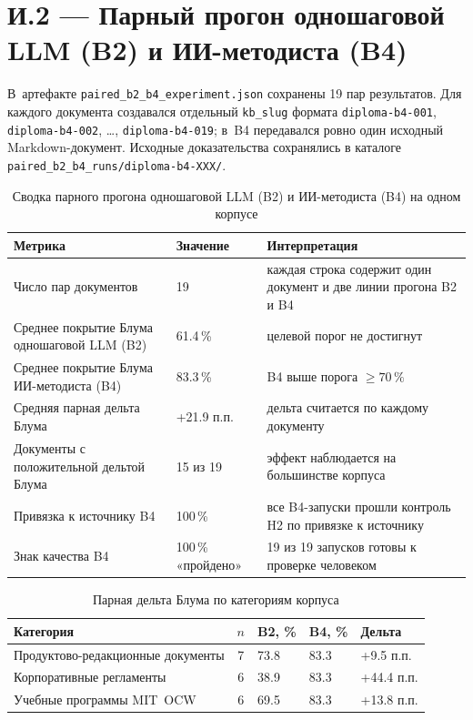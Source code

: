 \section*{И.2 — Парный прогон одношаговой LLM (B2) и ИИ-методиста (B4)}

В~артефакте \texttt{paired\_b2\_b4\_experiment.json} сохранены 19 пар
результатов. Для каждого документа создавался отдельный \texttt{kb\_slug}
формата \texttt{diploma-b4-001}, \texttt{diploma-b4-002}, \ldots,
\texttt{diploma-b4-019}; в~B4 передавался ровно один исходный
Markdown-документ. Исходные доказательства сохранялись в каталоге
\texttt{paired\_b2\_b4\_runs/diploma-b4-XXX/}.

\begin{table}[H]
  \caption{Сводка парного прогона одношаговой LLM (B2) и ИИ-методиста (B4) на одном корпусе}
  \label{tab:appendix-paired-b2-b4}
  \centering
  \begin{tabular}{|P{5.7cm}|P{2.5cm}|P{4.0cm}|}
  \hline
  \textbf{Метрика} & \textbf{Значение} & \textbf{Интерпретация} \\
  \hline
  Число пар документов & 19 & каждая строка содержит один документ и две линии прогона B2 и B4 \\
  \hline
  Среднее покрытие Блума одношаговой LLM (B2) & 61.4\,\% & целевой порог не достигнут \\
  \hline
  Среднее покрытие Блума ИИ-методиста (B4) & 83.3\,\% & B4 выше порога $\geq 70\,\%$ \\
  \hline
  Средняя парная дельта Блума & +21.9 п.п. & дельта считается по каждому документу \\
  \hline
  Документы с положительной дельтой Блума & 15 из 19 & эффект наблюдается на большинстве корпуса \\
  \hline
  Привязка к источнику B4 & 100\,\% & все B4-запуски прошли контроль H2 по привязке к источнику \\
  \hline
  Знак качества B4 & 100\,\% «пройдено» & 19 из 19 запусков готовы к проверке человеком \\
  \hline
  \end{tabular}
\end{table}

\begin{table}[H]
  \caption{Парная дельта Блума по категориям корпуса}
  \label{tab:appendix-paired-category}
  \centering
  \begingroup
  \small
  \setlength{\tabcolsep}{3pt}
  \renewcommand{\arraystretch}{1.12}
  \begin{tabular}{|P{4.8cm}|c|P{2.0cm}|P{2.0cm}|P{2.2cm}|}
  \hline
  \textbf{Категория} & \textbf{$n$} & \textbf{B2, \%} & \textbf{B4, \%} & \textbf{Дельта} \\
  \hline
  Продуктово-редакционные документы & 7 & 73.8 & 83.3 & +9.5 п.п. \\
  \hline
  Корпоративные регламенты & 6 & 38.9 & 83.3 & +44.4 п.п. \\
  \hline
  Учебные программы MIT~OCW & 6 & 69.5 & 83.3 & +13.8 п.п. \\
  \hline
  \end{tabular}
  \endgroup
\end{table}

